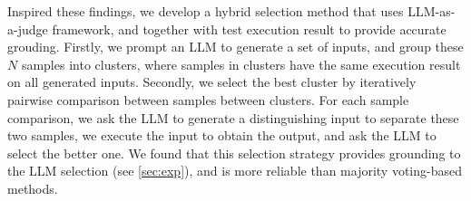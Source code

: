 

Inspired these findings, we develop a hybrid selection method that uses LLM-as-a-judge framework, and together with test execution result to provide accurate grouding. Firstly, we prompt an LLM to generate a set of inputs, and group these $N$ samples into clusters, where samples in clusters have the same execution result on all generated inputs. Secondly, we select the best cluster by iteratively pairwise comparison between samples between clusters. For each sample comparison, we ask the LLM to generate a distinguishing input to separate these two samples, we execute the input to obtain the output, and ask the LLM to select the better one. We found that this selection strategy provides grounding to the LLM selection (see \autoref{sec:exp}), and is more reliable than majority voting-based methods.








